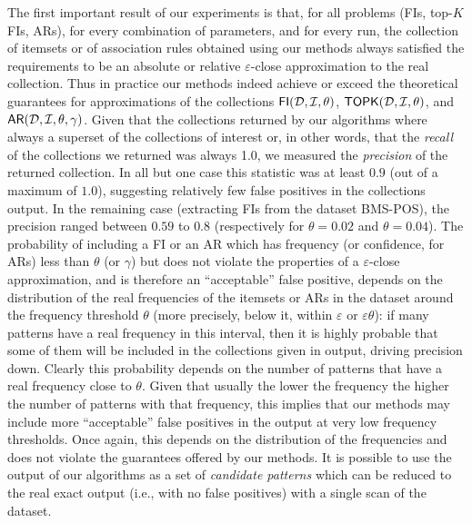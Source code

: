 The first important result of our experiments is that, for all problems (FIs,
top-$K$ FIs, ARs), for every combination of parameters, and for every run, the
collection of itemsets or of association rules obtained using our methods always
satisfied the requirements to be an absolute or relative $\varepsilon$-close
approximation to the real collection. Thus in practice our methods indeed
achieve or exceed the theoretical guarantees for approximations of the
collections $\mathsf{FI}({\cal D},{\cal I},\theta)$, $\mathsf{TOPK}({\cal D},{\cal I},\theta)$, and
$\mathsf{AR}({\cal D},{\cal I},\theta,\gamma)$.  
Given that the collections returned by our algorithms where always a superset of
the collections of interest or, in other words, that the \emph{recall} of the
collections we returned was always 1.0, we measured the \emph{precision} of the
returned collection. In all but one case this statistic was at least $0.9$ (out
of a maximum of $1.0$), suggesting relatively few false positives in the
collections output. In the remaining case (extracting FIs from the dataset
BMS-POS), the precision ranged between $0.59$ to $0.8$ (respectively for
$\theta=0.02$ and $\theta=0.04$). The
probability of including a FI or an AR which has frequency (or confidence, for
ARs) less than $\theta$ (or $\gamma$) but does not violate the properties of a
$\varepsilon$-close approximation, and is therefore an
``acceptable'' false positive, depends on the distribution of the
real frequencies of the itemsets or ARs in the dataset around the frequency
threshold $\theta$ (more precisely, below it, within $\varepsilon$ or
$\varepsilon\theta$): if many patterns have a real frequency in this interval,
then it is highly probable that some of them will be included in the collections
given in output, driving precision down. Clearly this probability depends on the
number of patterns that have a real frequency close to $\theta$. Given that
usually the lower the frequency the higher the number of patterns with that
frequency, this implies that our methods may include more ``acceptable'' false
positives in the output at very low frequency thresholds. Once again, this
depends on the distribution of the frequencies and does not violate the
guarantees offered by our methods. It is possible to use the output of our
algorithms as a set of \emph{candidate patterns} which can be reduced to the
real exact output (i.e., with no false positives) with a single scan of the
dataset.


